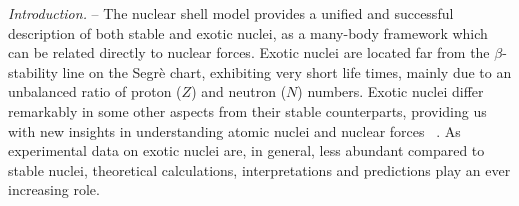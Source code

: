 \documentclass[aps,prl,twocolumn,groupedaddress,showkeys,showpacs,floatfix,superscriptaddress]{revtex4-1}
\newcommand\+{^\dagger}
\begin{document}
 
\maketitle

{\it Introduction.} -- The nuclear shell model \cite{Mayer:1949,Jensen:1949} provides a
unified and successful description 
of both stable and exotic nuclei, as a many-body framework which can be related 
directly to nuclear forces.  Exotic nuclei are located far from 
the $\beta$-stability line on the Segr\`e chart, exhibiting very short life times, mainly due to an
unbalanced ratio of proton ($Z$) and neutron ($N$) numbers.  Exotic
nuclei differ remarkably in some other aspects from their stable counterparts, 
providing us with new insights in understanding atomic nuclei and nuclear forces 
~\cite{Sorlin:2008er,Gade:2008we,nobel_otsuka}.  As experimental data
on exotic nuclei are, in general, less abundant compared to stable
nuclei, theoretical calculations, interpretations and predictions play
an ever increasing role.
\end{document}
